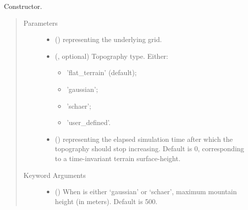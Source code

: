 \documentclass[letterpaper,10pt,english]{sphinxmanual}
\begin{document}
\begin{fulllineitems}
\begin{quote}
\begin{description}
\begin{itemize}
\end{itemize}

\end{description}\end{quote}

\begin{fulllineitems}
\label{\detokenize{api:grids.topography.Topography2d.__init__}}
Constructor.
\begin{quote}\begin{description}
\item[{Parameters}] \leavevmode\begin{itemize}
\item {} 
 () \textendash{} {\hyperref[\detokenize{api:grids.grid_xy.GridXY}]{}} representing the underlying grid.

\item {} 
 (, optional) \textendash{} 
Topography type. Either:
\begin{itemize}
\item {} 
’flat\_terrain’ (default);

\item {} 
’gaussian’;

\item {} 
’schaer’;

\item {} 
’user\_defined’.

\end{itemize}


\item {} 
 () \textendash{}  representing the elapsed simulation time after which the topography
should stop increasing. Default is 0, corresponding to a time-invariant terrain surface-height.

\end{itemize}

\item[{Keyword Arguments}] \leavevmode\begin{itemize}
\item {} 
 () \textendash{} When  is either ‘gaussian’ or ‘schaer’, maximum mountain height (in meters).
Default is 500.


\end{itemize}
\end{description}
\end{quote}
\end{fulllineitems}
\end{fulllineitems}
\end{document}
